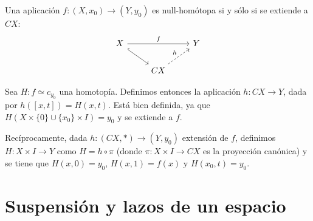 \begin{teor}
Una aplicación $f : (X, x_0) \longrightarrow (Y, y_0)$ es null-homótopa si y sólo si se extiende a $CX$: 
$$
\begin{tikzcd}
	X \arrow{rr}{f} \drar[hook] & & Y \\
	& CX \urar[dashed]{h} & 
\end{tikzcd}
$$
\end{teor}
\begin{demo}
Sea $H : f \simeq c_{y_0}$ una homotopía. Definimos entonces la aplicación $h : CX \longrightarrow Y$, dada por $h([x, t]) = H(x, t)$. Está bien definida, ya que $H(X \times \{ 0 \} \cup \{ x_0 \} \times I) = y_0$ y se extiende a $f$.\par 
Recíprocamente, dada $h : (CX, \ast) \longrightarrow (Y, y_0)$ extensión de $f$, definimos $H: X \times I \longrightarrow Y$ como $H = h \circ \pi$ (donde $\pi: X \times I \longrightarrow CX$ es la proyección canónica) y se tiene que 
$H(x, 0) = y_0$, $H(x, 1) = f(x)$ y $H(x_0, t) = y_0$.
\end{demo}

\section{Suspensión y lazos de un espacio}

